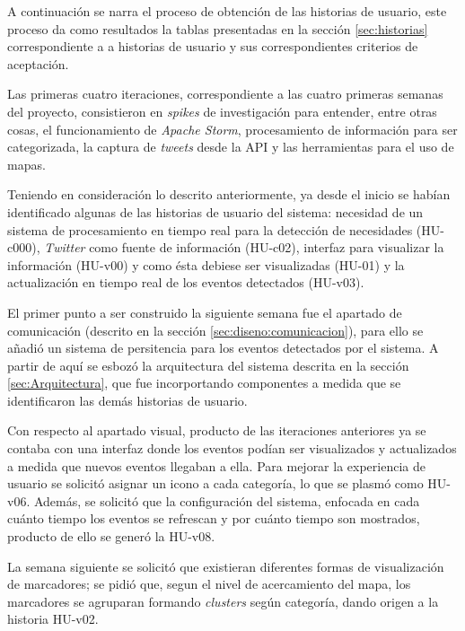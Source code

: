 A continuación se narra el proceso de obtención de las historias de usuario, este proceso da como resultados la tablas presentadas en la sección \ref{sec:historias} correspondiente a a historias de usuario y sus correspondientes criterios de aceptación.

Las primeras cuatro iteraciones, correspondiente a las cuatro primeras semanas del proyecto, consistieron en \textit{spikes} de investigación para entender, entre otras cosas, el funcionamiento de \textit{Apache Storm}, procesamiento de información para ser categorizada, la captura de \textit{tweets} desde la API y las herramientas para el uso de mapas. 

Teniendo en consideración lo descrito anteriormente, ya desde el inicio se habían identificado algunas de las historias de usuario del sistema: necesidad de un sistema de procesamiento en tiempo real para la detección de necesidades (HU-c000), \textit{Twitter} como fuente de información (HU-c02), interfaz para visualizar la información (HU-v00) y como ésta debiese ser visualizadas (HU-01) y la actualización en tiempo real de los eventos detectados (HU-v03).

El primer punto a ser construido la siguiente semana fue el apartado de comunicación (descrito en la sección \ref{sec:diseno:comunicacion}), para ello se añadió un sistema de persitencia para los eventos detectados por el sistema. A partir de aquí se esbozó la arquitectura del sistema descrita en la sección \ref{sec:Arquitectura}, que fue incorportando componentes a medida que se identificaron las demás historias de usuario.

Con respecto al apartado visual, producto de las iteraciones anteriores ya se contaba con una interfaz donde los eventos podían ser visualizados y actualizados a medida que nuevos eventos llegaban a ella. Para mejorar la experiencia de usuario se solicitó asignar un icono a cada categoría, lo que se plasmó como HU-v06. Además, se solicitó que la configuración del sistema, enfocada en cada cuánto tiempo los eventos se refrescan y por cuánto tiempo son mostrados, producto de ello se generó la HU-v08.

La semana siguiente se solicitó que existieran diferentes formas de visualización de marcadores; se pidió que, segun el nivel de acercamiento del mapa, los marcadores se agruparan formando \textit{clusters} según categoría, dando origen a la historia HU-v02.

